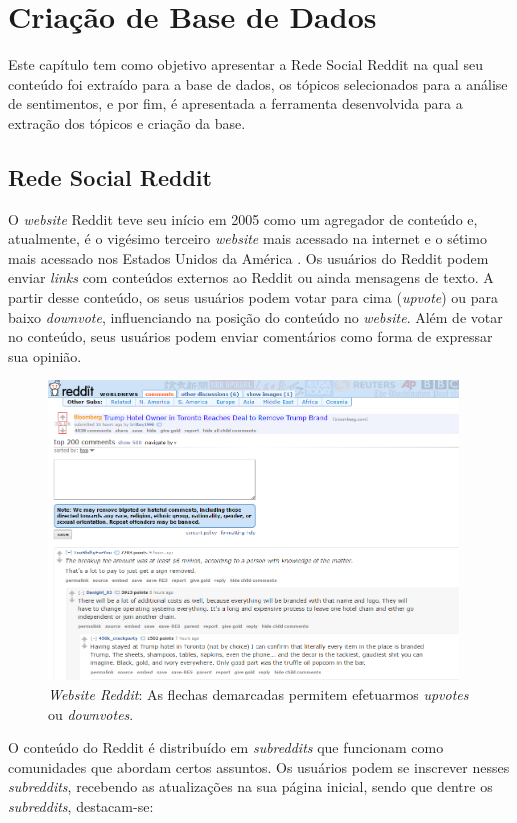 \chapter{Criação de Base de Dados}
\label{cap:banco}
Este capítulo tem como objetivo apresentar a Rede Social Reddit na qual seu
conteúdo foi extraído para a base de dados, os tópicos
selecionados para a análise de sentimentos, e por fim, é apresentada a
ferramenta desenvolvida para a extração dos tópicos e criação da base.
\section{Rede Social Reddit}
\label{cap:Reddit}

O \textit{website} Reddit teve seu início em 2005 como um agregador de
conteúdo e, atualmente, é o vigésimo terceiro \textit{website} mais acessado na
internet e o sétimo mais acessado nos Estados Unidos da América \cite{alexa}.
Os usuários do Reddit podem enviar \textit{links} com conteúdos externos
ao Reddit ou ainda mensagens de texto. A partir desse conteúdo, os seus
usuários podem votar para cima (\textit{upvote}) ou para baixo \textit{downvote},
influenciando na posição do conteúdo no \textit{website}. Além de votar no conteúdo, seus usuários podem enviar comentários como
forma de expressar sua opinião.

\begin{figure}[!htbp]
\centering
\includegraphics[height=300px]{imagens/reddit.png}
\caption{\textit{Website Reddit}:  As flechas demarcadas permitem efetuarmos
\textit{upvotes} ou \textit{downvotes}.}
\label{fig:reddit}
\end{figure}

O conteúdo do Reddit é distribuído em \textit{subreddits} que funcionam como
comunidades que abordam certos assuntos. Os usuários podem se inscrever nesses
\textit{subreddits}, recebendo as atualizações na sua página inicial, sendo
que dentre os \textit{subreddits}, destacam-se:


